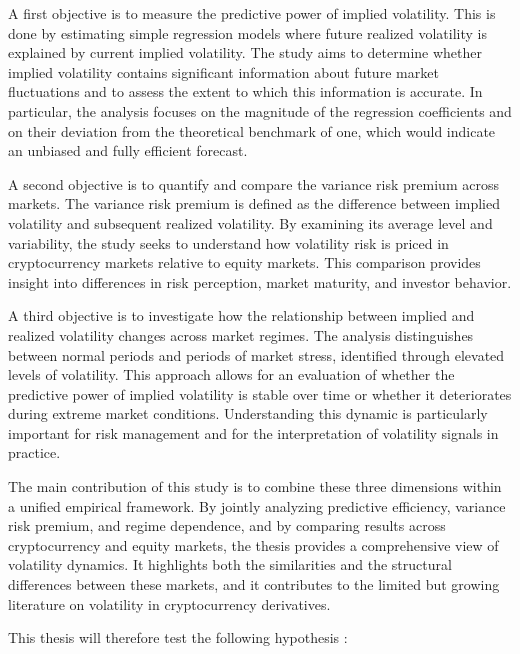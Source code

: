 \documentclass[11pt,a4paper,openany]{report}
\begin{document}
A first objective is to measure the predictive power of implied
volatility. This is done by estimating simple regression models where
future realized volatility is explained by current implied volatility.
The study aims to determine whether implied volatility contains
significant information about future market fluctuations and to assess
the extent to which this information is accurate. In particular, the
analysis focuses on the magnitude of the regression coefficients and on
their deviation from the theoretical benchmark of one, which would
indicate an unbiased and fully efficient forecast.

A second objective is to quantify and compare the variance risk premium
across markets. The variance risk premium is defined as the difference
between implied volatility and subsequent realized volatility. By
examining its average level and variability, the study seeks to
understand how volatility risk is priced in cryptocurrency markets
relative to equity markets. This comparison provides insight into
differences in risk perception, market maturity, and investor behavior.

A third objective is to investigate how the relationship between implied
and realized volatility changes across market regimes. The analysis
distinguishes between normal periods and periods of market stress,
identified through elevated levels of volatility. This approach allows
for an evaluation of whether the predictive power of implied volatility
is stable over time or whether it deteriorates during extreme market
conditions. Understanding this dynamic is particularly important for
risk management and for the interpretation of volatility signals in
practice.

The main contribution of this study is to combine these three dimensions
within a unified empirical framework. By jointly analyzing predictive
efficiency, variance risk premium, and regime dependence, and by
comparing results across cryptocurrency and equity markets, the thesis
provides a comprehensive view of volatility dynamics. It highlights both
the similarities and the structural differences between these markets,
and it contributes to the limited but growing literature on volatility
in cryptocurrency derivatives.

This thesis will therefore test the following hypothesis :
\end{document}
